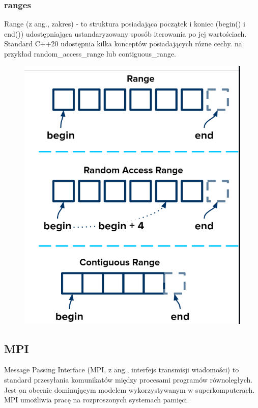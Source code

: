 \documentclass[11pt]{beamer}
\begin{document}
\subsubsection{ranges}
\begin{frame}{\subsubsecname}
Range (z ang., zakres) - to struktura posiadająca początek i koniec (begin() i end()) udostępniająca ustandaryzowany sposób iterowania po jej wartościach.
Standard C++20 udostępnia kilka konceptów posiadających rózne cechy. na przykład random\_access\_range lub contiguous\_range.
\begin{figure}[h]
\includegraphics[scale=0.25]{ranges}
\end{figure}
\end{frame}

\subsection{MPI}
\begin{frame}{\subsecname}
Message Passing Interface (MPI, z ang., interfejs transmisji wiadomości) to standard przesyłania komunikatów między procesami programów równoległych. Jest on obecnie dominującym modelem wykorzystywanym w superkomputerach. MPI umożliwia pracę na rozproszonych systemach pamięci.
\end{frame}
\end{document}
